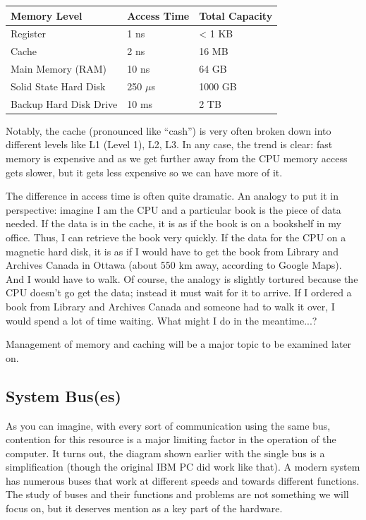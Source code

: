 \begin{center}
	\begin{tabular}{l|l|l}
	\textbf{Memory Level} & \textbf{Access Time} & \textbf{Total Capacity} \\ \hline
	Register & 1 ns & < 1 KB \\
	Cache & 2 ns & 16 MB \\
	Main Memory (RAM) & 10 ns & 64 GB \\
	Solid State Hard Disk & 250 $\mu$s & 1000 GB \\
	Backup Hard Disk Drive & 10 ms & 2 TB \\
	\end{tabular}
\end{center}

Notably, the cache (pronounced like ``cash'') is very often broken down into different levels like L1 (Level 1), L2, L3. In any case, the trend is clear: fast memory is expensive and as we get further away from the CPU memory access gets slower, but it gets less expensive so we can have more of it. 

The difference in access time is often quite dramatic. An analogy to put it in perspective: imagine I am the CPU and a particular book is the piece of data needed. If the data is in the cache, it is as if the book is on a bookshelf in my office. Thus, I can retrieve the book very quickly. If the data for the CPU on a magnetic hard disk, it is as if I would have to get the book from Library and Archives Canada in Ottawa (about 550 km away, according to Google Maps). And I would have to walk. Of course, the analogy is slightly tortured because the CPU doesn't go get the data; instead it must wait for it to arrive. If I ordered a book from Library and Archives Canada and someone had to walk it over, I would spend a lot of time waiting. What might I do in the meantime...?

Management of memory and caching will be a major topic to be examined later on.

\subsection*{System Bus(es)}
As you can imagine, with every sort of communication using the same bus, contention for this resource is a major limiting factor in the operation of the computer. It turns out, the diagram shown earlier with the single bus is a simplification (though the original IBM PC did work like that). A modern system has numerous buses that work at different speeds and towards different functions. The study of buses and their functions and problems are not something we will focus on, but it deserves mention as a key part of the hardware.

